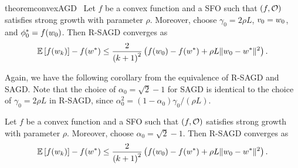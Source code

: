 \begin{restatable}{theorem}{convexAGD}~\label{thm:sc-agd}
    Let \( f \) be a convex function and \oracle{} a SFO such that \( \rbr{f, \oracle{}} \) satisfies strong growth with parameter \( \rho \).
    Moreover, choose \( \gamma_0 = 2 \rho L \), \( v_0 = \w_0 \), and \( \phi_0^* = f(\w_0) \).
    Then R-SAGD converges as  
    \[ \E\sbr{f(\wk)} - f(\wopt) \leq \frac{2}{\rbr{k+1}^2}\rbr{f(\w_0) - f(\wopt) + \rho L \norm{\w_0 - \wopt}^2 }. \]
\end{restatable}

Again, we have the following corollary from the equivalence of R-SAGD and SAGD. 
Note that the choice of \( \alpha_0 = \sqrt{2} - 1 \) for SAGD is identical to the choice of \( \gamma_0 = 2 \rho L \) in R-SAGD, since \( \alpha_0^2 = (1 - \alpha_0) \gamma_0 / (\rho L) \).

\begin{corollary}
    Let \( f \) be a convex function and \oracle{} a SFO such that \( \rbr{f, \oracle{}} \) satisfies strong growth with parameter \( \rho \).
    Moreover, choose \( \alpha_0 = \sqrt{2} - 1 \).
    Then R-SAGD converges as  
    \[ \E\sbr{f(\wk)} - f(\wopt) \leq \frac{2}{\rbr{k+1}^2}\rbr{f(\w_0) - f(\wopt) + \rho L \norm{\w_0 - \wopt}^2 }. \]
\end{corollary}


